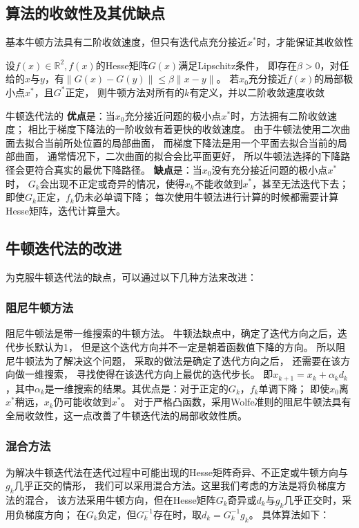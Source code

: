 \subsection{算法的收敛性及其优缺点}
    基本牛顿方法具有二阶收敛速度，但只有迭代点充分接近$x^*$时，才能保证其收敛性
    
\begin{theorem}\label{thm2_1}
    设$f(x) \in \mathbb{R}^2, f(x)$的Hesse矩阵$G(x)$满足Lipschitz条件，
    即存在$\beta>0$，对任给的$x$与$y$，有$\|G(x)-G(y)\|\leq\beta\|x-y\|$。
    若$x_0$充分接近$f(x)$的局部极小点$x^*$，且$G^*$正定，
    则牛顿方法对所有的$k$有定义，并以二阶收敛速度收敛
\end{theorem}
    
    牛顿迭代法的
    \textbf{优点}是：当$x_0$充分接近问题的极小点$x^*$时，方法拥有二阶收敛速度；
    相比于梯度下降法的一阶收敛有着更快的收敛速度。
    由于牛顿法使用二次曲面去拟合当前所处位置的局部曲面，
    而梯度下降法是用一个平面去拟合当前的局部曲面，
    通常情况下，二次曲面的拟合会比平面更好，
    所以牛顿法选择的下降路径会更符合真实的最优下降路径。
    \textbf{缺点}是：当$x_0$没有充分接近问题的极小点$x^*$时，
    $G_k$会出现不正定或奇异的情况，使得${x_k}$不能收敛到$x^*$，甚至无法迭代下去；
    即使$G_k$正定，${f_k}$仍未必单调下降；
    每次使用牛顿法进行计算的时候都需要计算Hesse矩阵，迭代计算量大。
    
    
\subsection{牛顿迭代法的改进}
    为克服牛顿迭代法的缺点，可以通过以下几种方法来改进：
    \subsubsection{阻尼牛顿方法}
        阻尼牛顿法是带一维搜索的牛顿方法。
        牛顿法缺点中，确定了迭代方向之后，迭代步长默认为1，
        但是这个迭代方向并不一定是朝着函数值下降的方向。
        所以阻尼牛顿法为了解决这个问题，
        采取的做法是确定了迭代方向之后，
        还需要在该方向做一维搜索，
        寻找使得在该迭代方向上最优的迭代步长。
        即$x_{k+1}=x_k+\alpha_kd_k$，其中$\alpha_k$是一维搜索的结果。其优点是：对于正定的$G_k$，${f_k}$单调下降；
        即使$x_0$离$x^*$稍远，${x_k}$仍可能收敛到$x^*$。
        对于严格凸函数，采用Wolfe准则的阻尼牛顿法具有全局收敛性，这一点改善了牛顿迭代法的局部收敛性质。
        
    \subsubsection{混合方法}
        为解决牛顿迭代法在迭代过程中可能出现的Hesse矩阵奇异、不正定或牛顿方向与$g_k$几乎正交的情形，
        我们可以采用混合方法。这里我们考虑的方法是将负梯度方法的混合，
        该方法采用牛顿方向，但在Hesse矩阵$G_k$奇异或$d_k$与$g_k$几乎正交时，采用负梯度方向；
        在$G_k$负定，但$G^{-1}_k$存在时，取$d_k=G^{-1}_kg_k$。
        具体算法如下：
        
